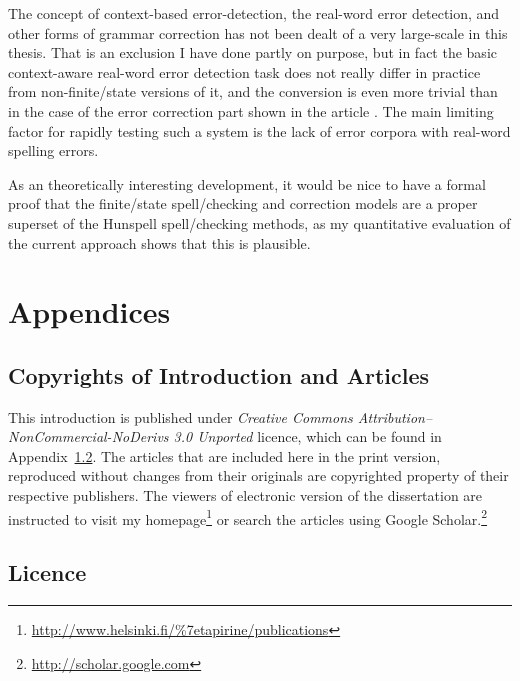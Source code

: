 \documentclass[officiallayout]{unihelcompling}
\begin{document}
The concept of context-based error-detection, the real-word error detection,
and other forms of grammar correction has not been dealt of a very large-scale
in this thesis. That is an exclusion I have done partly on purpose, but in fact
the basic context-aware real-word error detection task does not really differ
in practice from non-finite\-/state versions of it, and the conversion is even
more trivial than in the case of the error correction part shown in the article
. The main limiting factor for rapidly testing
such a system is the lack of error corpora with real-word spelling errors.

As an theoretically interesting development, it would be nice to have a formal
proof that the finite\-/state spell\-/checking and correction models are a proper
superset of the Hunspell spell\-/checking methods, as my quantitative
evaluation of the current approach shows that this is plausible.






\appendix
\chapter{Appendices}
\section{Copyrights of Introduction and Articles}
\label{appendix:copyrights}

This introduction is published under \emph{Creative Commons
Attribution–NonCommercial-NoDerivs 3.0 Unported} licence, which can be found in
Appendix~\ref{appendix:licence}. The articles that are included
here in the print version, reproduced without changes from their originals are
copyrighted property of their respective publishers. The viewers of electronic
version of the dissertation are instructed to visit my
homepage\footnote{\url{http://www.helsinki.fi/\%7etapirine/publications}} or
        search the articles using Google
        Scholar.\footnote{\url{http://scholar.google.com}}

\iffalse
\section{Original Articles}
\label{appendix:articles}

\includepdfset{pagecommand={}}












\fi

\section{Licence}
\label{appendix:licence}


\end{document}
